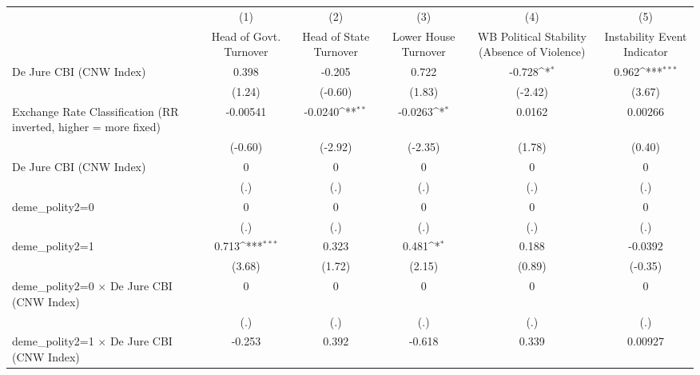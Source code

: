{
\def\sym#1{\ifmmode^{#1}\else\(^{#1}\)\fi}
\begin{tabular}{l*{5}{c}}
\hline\hline
                &\multicolumn{1}{c}{(1)}&\multicolumn{1}{c}{(2)}&\multicolumn{1}{c}{(3)}&\multicolumn{1}{c}{(4)}&\multicolumn{1}{c}{(5)}\\
                &\multicolumn{1}{c}{Head of Govt. Turnover}&\multicolumn{1}{c}{Head of State Turnover}&\multicolumn{1}{c}{Lower House Turnover}&\multicolumn{1}{c}{WB Political Stability (Absence of Violence)}&\multicolumn{1}{c}{Instability Event Indicator}\\
\hline
De Jure CBI (CNW Index)&    0.398         &   -0.205         &    0.722         &   -0.728\sym{*}  &    0.962\sym{***}\\
                &   (1.24)         &  (-0.60)         &   (1.83)         &  (-2.42)         &   (3.67)         \\
[1em]
Exchange Rate Classification (RR inverted, higher = more fixed)& -0.00541         &  -0.0240\sym{**} &  -0.0263\sym{*}  &   0.0162         &  0.00266         \\
                &  (-0.60)         &  (-2.92)         &  (-2.35)         &   (1.78)         &   (0.40)         \\
[1em]
De Jure CBI (CNW Index)&        0         &        0         &        0         &        0         &        0         \\
                &      (.)         &      (.)         &      (.)         &      (.)         &      (.)         \\
[1em]
deme\_polity2=0  &        0         &        0         &        0         &        0         &        0         \\
                &      (.)         &      (.)         &      (.)         &      (.)         &      (.)         \\
[1em]
deme\_polity2=1  &    0.713\sym{***}&    0.323         &    0.481\sym{*}  &    0.188         &  -0.0392         \\
                &   (3.68)         &   (1.72)         &   (2.15)         &   (0.89)         &  (-0.35)         \\
[1em]
deme\_polity2=0 $\times$ De Jure CBI (CNW Index)&        0         &        0         &        0         &        0         &        0         \\
                &      (.)         &      (.)         &      (.)         &      (.)         &      (.)         \\
[1em]
deme\_polity2=1 $\times$ De Jure CBI (CNW Index)&   -0.253         &    0.392         &   -0.618         &    0.339         &  0.00927         \\

\end{tabular}}
